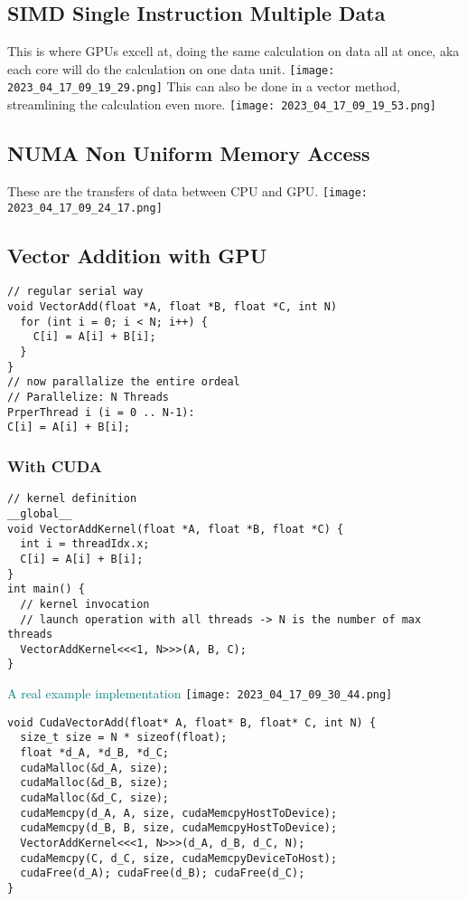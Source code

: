 \documentclass[main.tex,fontsize=8pt,paper=a4,paper=portrait,DIV=calc,]{scrartcl}
\begin{document}
\subsection{SIMD Single Instruction Multiple Data}
This is where GPUs excell at, doing the same calculation on data all at once, aka each core will do the calculation on one data unit.\newline
\texttt{[image: 2023\_04\_17\_09\_19\_29.png]}\newline
This can also be done in a vector method, streamlining the calculation even more.\newline
\texttt{[image: 2023\_04\_17\_09\_19\_53.png]}

\subsection{NUMA Non Uniform Memory Access}
These are the transfers of data between CPU and GPU.\newline
\texttt{[image: 2023\_04\_17\_09\_24\_17.png]}

\lstset{
    language=C,
    style=code,
}

\subsection{Vector Addition with GPU}
\begin{lstlisting}
// regular serial way
void VectorAdd(float *A, float *B, float *C, int N)
  for (int i = 0; i < N; i++) {
    C[i] = A[i] + B[i];
  }
}
// now parallalize the entire ordeal
// Parallelize: N Threads
PrperThread i (i = 0 .. N-1):
C[i] = A[i] + B[i];
\end{lstlisting}

\subsubsection{With CUDA}
\begin{lstlisting}
// kernel definition
__global__
void VectorAddKernel(float *A, float *B, float *C) {
  int i = threadIdx.x;
  C[i] = A[i] + B[i];
}
int main() {
  // kernel invocation
  // launch operation with all threads -> N is the number of max threads
  VectorAddKernel<<<1, N>>>(A, B, C);
}
\end{lstlisting}

\textcolor{teal}{A real example implementation}
\texttt{[image: 2023\_04\_17\_09\_30\_44.png]}\newline
\begin{lstlisting}
void CudaVectorAdd(float* A, float* B, float* C, int N) {
  size_t size = N * sizeof(float);
  float *d_A, *d_B, *d_C;
  cudaMalloc(&d_A, size);
  cudaMalloc(&d_B, size);
  cudaMalloc(&d_C, size);
  cudaMemcpy(d_A, A, size, cudaMemcpyHostToDevice);
  cudaMemcpy(d_B, B, size, cudaMemcpyHostToDevice);
  VectorAddKernel<<<1, N>>>(d_A, d_B, d_C, N);
  cudaMemcpy(C, d_C, size, cudaMemcpyDeviceToHost);
  cudaFree(d_A); cudaFree(d_B); cudaFree(d_C);
}
\end{lstlisting}
\end{document}
